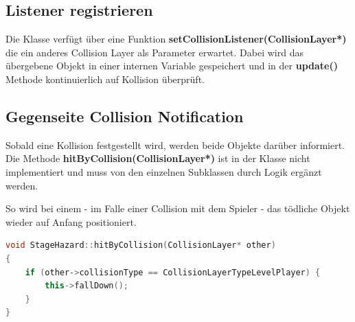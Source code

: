 \subsection{Listener registrieren}

Die Klasse verfügt über eine Funktion \textbf{setCollisionListener(CollisionLayer*)} die ein anderes Collision Layer als Parameter erwartet. Dabei wird das übergebene Objekt in einer internen Variable gespeichert und in der \textbf{update()} Methode kontinuierlich auf Kollision überprüft.

\subsection{Gegenseite Collision Notification}

Sobald eine Kollision festgestellt wird, werden beide Objekte darüber informiert. Die Methode \textbf{hitByCollision(CollisionLayer*)} ist in der  Klasse nicht implementiert und muss von den einzelnen Subklassen durch Logik ergänzt werden.

So wird bei einem  - im Falle einer Collision mit dem Spieler - das tödliche Objekt wieder auf Anfang positioniert.

\begin{lstlisting}[label=lst:hit_by_collision,
				   language=C++,
				   firstnumber=32,
				   caption=Collision Notification ( StageHazard.cpp )]
void StageHazard::hitByCollision(CollisionLayer* other)
{
	if (other->collisionType == CollisionLayerTypeLevelPlayer) {
		this->fallDown();
	}
}
\end{lstlisting}

